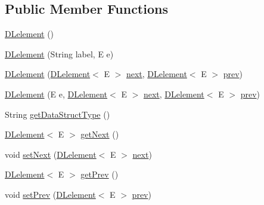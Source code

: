 \subsection*{Public Member Functions}
\begin{DoxyCompactItemize}
\item 
\hyperlink{classbridges_1_1base_1_1_d_lelement_a525b572340e161d9c430baff10b64ab2}{D\+Lelement} ()
\item 
\hyperlink{classbridges_1_1base_1_1_d_lelement_a6aa1d4a3dad4a196c2ed079d108562bc}{D\+Lelement} (String label, E e)
\item 
\hyperlink{classbridges_1_1base_1_1_d_lelement_ab1e4eace66bb1b097463c4f04e964cd0}{D\+Lelement} (\hyperlink{classbridges_1_1base_1_1_d_lelement}{D\+Lelement}$<$ E $>$ \hyperlink{classbridges_1_1base_1_1_d_lelement_ae2672f6718bf5e1758386d33e59d9340}{next}, \hyperlink{classbridges_1_1base_1_1_d_lelement}{D\+Lelement}$<$ E $>$ \hyperlink{classbridges_1_1base_1_1_d_lelement_a6eba4876f820b75ac6bde01d7dea9da7}{prev})
\item 
\hyperlink{classbridges_1_1base_1_1_d_lelement_a3ffba30204a2ea6939b07b0ded123af5}{D\+Lelement} (E e, \hyperlink{classbridges_1_1base_1_1_d_lelement}{D\+Lelement}$<$ E $>$ \hyperlink{classbridges_1_1base_1_1_d_lelement_ae2672f6718bf5e1758386d33e59d9340}{next}, \hyperlink{classbridges_1_1base_1_1_d_lelement}{D\+Lelement}$<$ E $>$ \hyperlink{classbridges_1_1base_1_1_d_lelement_a6eba4876f820b75ac6bde01d7dea9da7}{prev})
\item 
String \hyperlink{classbridges_1_1base_1_1_d_lelement_a4a0e8f7bd377a652927a741e70aae6d3}{get\+Data\+Struct\+Type} ()
\item 
\hyperlink{classbridges_1_1base_1_1_d_lelement}{D\+Lelement}$<$ E $>$ \hyperlink{classbridges_1_1base_1_1_d_lelement_a35e88e8d991d6f23ec63b3ef3f6cce4e}{get\+Next} ()
\item 
void \hyperlink{classbridges_1_1base_1_1_d_lelement_a1dfea3f7b47901d539aefcba2cd900d9}{set\+Next} (\hyperlink{classbridges_1_1base_1_1_d_lelement}{D\+Lelement}$<$ E $>$ \hyperlink{classbridges_1_1base_1_1_d_lelement_ae2672f6718bf5e1758386d33e59d9340}{next})
\item 
\hyperlink{classbridges_1_1base_1_1_d_lelement}{D\+Lelement}$<$ E $>$ \hyperlink{classbridges_1_1base_1_1_d_lelement_a859f08f38513ecdfff0eb11bd2b98ce7}{get\+Prev} ()
\item 
void \hyperlink{classbridges_1_1base_1_1_d_lelement_a60b1f5bdaf33ad1dfcc493ebc51939d1}{set\+Prev} (\hyperlink{classbridges_1_1base_1_1_d_lelement}{D\+Lelement}$<$ E $>$ \hyperlink{classbridges_1_1base_1_1_d_lelement_a6eba4876f820b75ac6bde01d7dea9da7}{prev})
\end{DoxyCompactItemize}
